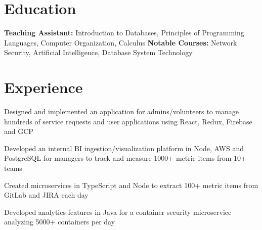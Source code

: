 \documentclass[]{deedy-resume}
\begin{document}
%
%



\section{Education}

\textbf{Teaching Assistant:} Introduction to Databases, Principles of Programming Languages, Computer Organization, Calculus
\newline
\textbf{Notable Courses:} Network Security, Artificial Intelligence, Database System Technology
\sectionsep

\section{Experience}

\begin{tightemize}
\item Designed and implemented an application for admins/volunteers to manage hundreds of service requests and user applications using React, Redux, Firebase and GCP
\end{tightemize}
\sectionsep

\begin{tightemize}
\item Developed an internal BI ingestion/visualization platform in Node, AWS and PostgreSQL for managers to track and measure 1000+ metric items from 10+ teams
\item Created microservices in TypeScript and Node to extract 100+ metric items from GitLab and JIRA each day
\item Developed analytics features in Java for a container security microservice analyzing 5000+ containers per day
\end{tightemize}
\sectionsep
\end{document}
